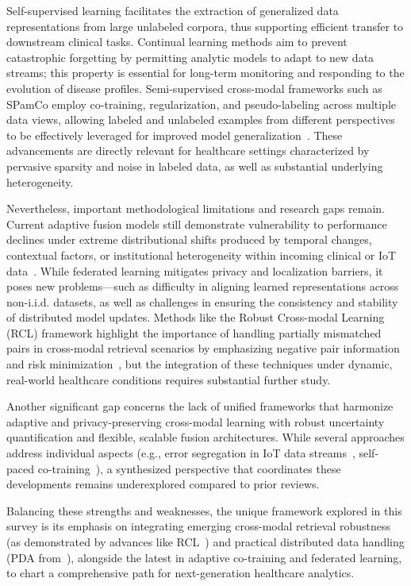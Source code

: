 \documentclass[sigconf]{acmart}
\begin{document}
Self-supervised learning facilitates the extraction of generalized data representations from large unlabeled corpora, thus supporting efficient transfer to downstream clinical tasks. Continual learning methods aim to prevent catastrophic forgetting by permitting analytic models to adapt to new data streams; this property is essential for long-term monitoring and responding to the evolution of disease profiles. Semi-supervised cross-modal frameworks such as SPamCo employ co-training, regularization, and pseudo-labeling across multiple data views, allowing labeled and unlabeled examples from different perspectives to be effectively leveraged for improved model generalization~\cite{ref104,ref105}. These advancements are directly relevant for healthcare settings characterized by pervasive sparsity and noise in labeled data, as well as substantial underlying heterogeneity.

Nevertheless, important methodological limitations and research gaps remain. Current adaptive fusion models still demonstrate vulnerability to performance declines under extreme distributional shifts produced by temporal changes, contextual factors, or institutional heterogeneity within incoming clinical or IoT data~\cite{ref106}. While federated learning mitigates privacy and localization barriers, it poses new problems—such as difficulty in aligning learned representations across non-i.i.d. datasets, as well as challenges in ensuring the consistency and stability of distributed model updates. Methods like the Robust Cross-modal Learning (RCL) framework highlight the importance of handling partially mismatched pairs in cross-modal retrieval scenarios by emphasizing negative pair information and risk minimization~\cite{ref104}, but the integration of these techniques under dynamic, real-world healthcare conditions requires substantial further study.

Another significant gap concerns the lack of unified frameworks that harmonize adaptive and privacy-preserving cross-modal learning with robust uncertainty quantification and flexible, scalable fusion architectures. While several approaches address individual aspects (e.g., error segregation in IoT data streams~\cite{ref106}, self-paced co-training~\cite{ref105}), a synthesized perspective that coordinates these developments remains underexplored compared to prior reviews.

Balancing these strengths and weaknesses, the unique framework explored in this survey is its emphasis on integrating emerging cross-modal retrieval robustness (as demonstrated by advances like RCL~\cite{ref104}) and practical distributed data handling (PDA from~\cite{ref106}), alongside the latest in adaptive co-training and federated learning, to chart a comprehensive path for next-generation healthcare analytics.
\end{document}
